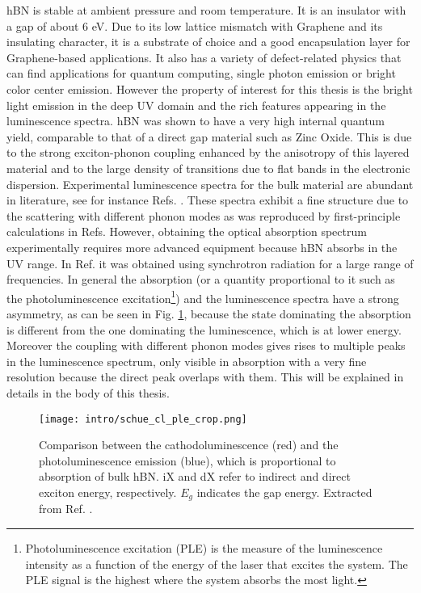 hBN is stable at ambient pressure and room temperature. It is an insulator with a gap of about 6 eV. Due to its low lattice mismatch with Graphene and its insulating character, it is a substrate of choice and a good encapsulation layer for Graphene-based applications.\cite{kretinin2014electronic} It also has a variety of defect-related physics that can find applications for quantum computing,\cite{ivady2020ab} single photon emission\cite{grosso2017tunable} or bright color center emission.\cite{wigger2019phonon} However the property of interest for this thesis is the bright light emission in the deep UV domain and the rich features appearing in the luminescence spectra. hBN was shown to have a very high internal quantum yield, comparable to that of a direct gap material such as Zinc Oxide.\cite{schue2019bright} This is due to the strong exciton-phonon coupling enhanced by the anisotropy of this layered material and to the large density of transitions due to flat bands in the electronic dispersion.\cite{elias2021flat} Experimental luminescence spectra for the bulk material are abundant in literature, see for instance Refs. \cite{schue2019bright,cassabois2016hexagonal}. These spectra exhibit a fine structure due to the scattering with different phonon modes as was reproduced by first-principle calculations in Refs. \cite{cannuccia2019theory,paleari2019exciton}
However, obtaining the optical absorption spectrum experimentally requires more advanced equipment because \acrshort{hBN} absorbs in the \acrshort{UV} range. In Ref. \cite{artus2021ellipsometry} it was obtained using synchrotron radiation for a large range of frequencies. 
In general the absorption (or a quantity proportional to it such as the photoluminescence excitation\footnote{Photoluminescence excitation (PLE) is the measure of the luminescence intensity as a function of the energy of the laser that excites the system. The PLE signal is the highest where the system absorbs the most light.}) and the luminescence spectra have a strong asymmetry, as can be seen in Fig. \ref{fig:cl_ple}, because the state dominating the absorption is different from the one dominating the luminescence, which is at lower energy. Moreover the coupling with different phonon modes gives rises to multiple peaks in the luminescence spectrum, only visible in absorption with a very fine resolution because the direct peak overlaps with them. This will be explained in details in the body of this thesis.
\begin{figure}[h!b]
	\vspace{0.2cm}
	\setcapindent{2em}
	\centering
	\texttt{[image: intro/schue\_cl\_ple\_crop.png]}
	\caption{Comparison between the cathodoluminescence (red) and the photoluminescence emission (blue), which is proportional to absorption of bulk hBN. iX and dX refer to indirect and direct exciton energy, respectively. $E_g$ indicates the gap energy.  Extracted from Ref. \cite{schue2019bright}.}
	\label{fig:cl_ple}
\end{figure}

